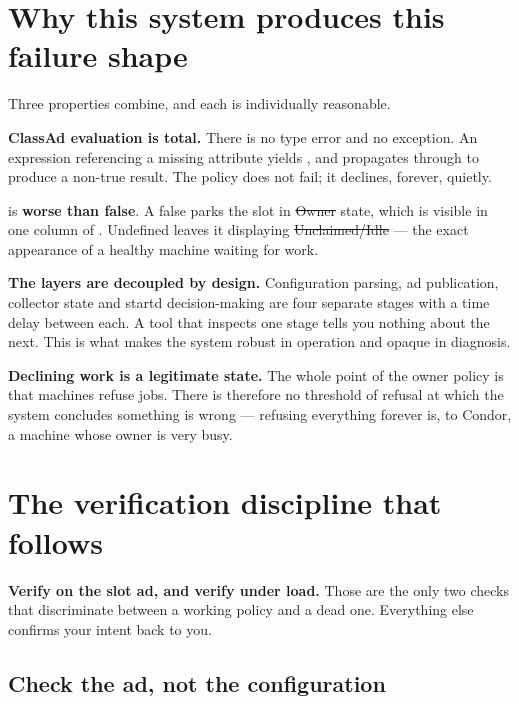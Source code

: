 \section{Why this system produces this failure shape}

Three properties combine, and each is individually reasonable.

\textbf{ClassAd evaluation is total.} There is no type error and no exception. An
expression referencing a missing attribute yields , and
 propagates through \kn{\&\&} to produce a non-true result. The
policy does not fail; it declines, forever, quietly.

\begin{trap}
 is \textbf{worse than false}. A false  parks the slot in
\st{Owner} state, which is visible in one column of . Undefined
leaves it displaying \st{Unclaimed/Idle} --- the exact appearance of a healthy
machine waiting for work.
\end{trap}

\textbf{The layers are decoupled by design.} Configuration parsing, ad
publication, collector state and startd decision-making are four separate stages
with a time delay between each. A tool that inspects one stage tells you nothing
about the next. This is what makes the system robust in operation and opaque in
diagnosis.

\textbf{Declining work is a legitimate state.} The whole point of the owner
policy is that machines refuse jobs. There is therefore no threshold of refusal
at which the system concludes something is wrong --- refusing everything forever
is, to Condor, a machine whose owner is very busy.

\section{The verification discipline that follows}

\begin{keypoint}
\textbf{Verify on the slot ad, and verify under load.} Those are the only two
checks that discriminate between a working policy and a dead one. Everything
else confirms your intent back to you.
\end{keypoint}

\subsection{Check the ad, not the configuration}

